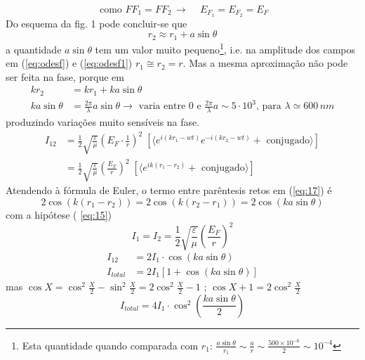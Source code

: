 \documentclass[a4paper,12pt]{article}
\begin{document}
\begin{equation}
	\label{eq:15} \text{ como } F F_1 = F F_2 \, \to \, \quad E_{F_1} = E_{F_2} = E_{F} 
\end{equation}
Do esquema da fig. 1 pode concluir-se que 
\begin{equation}
	\label{eq:16} r_2 \approx r_1 + a \sin \theta 
\end{equation}
a quantidade $ a \sin \theta $ tem um valor muito pequeno\footnote{Esta quantidade quando comparada com $ r_1$: \; $ \frac{a \sin \theta }{r_1 } \sim \frac{a}{r } \sim \frac{ 500 \times 10^{-6} }{2 } \sim 10^{-4}$},
i.e. na amplitude dos campos em (\ref{eq:odesf}) e (\ref{eq:odesf1}) $ r_1 \cong r_2 = r$. 
Mas a mesma aproximação não pode ser feita na fase, porque em 
\begin{align}
	k r_2 &= k r_1 +k a \sin \theta  \nonumber \\ %
	k a \sin \theta &= \frac{ 2 \pi }{\lambda } a \sin \theta  \rightarrow \text{ varia entre } 0 \text{ e } \frac{ 2 \pi}{\lambda} a \sim 5 \cdot 10^{3} \text{, para }  \lambda \simeq 600\,nm  \nonumber 
\end{align}
produzindo variações muito sensíveis na fase. 
\begin{align}
	\label{eq:17} I_{12} &=\frac{1}{2}\sqrt{\frac{ \varepsilon}{\mu}} \left(E_{F} \cdot \frac{1}{r }\right)^2 \; \left[ \langle e^{ i (k r_1 -wt )} e^{ -i (k r_2 -wt ) } + \text{ conjugado} \rangle \right] \nonumber \\
	&= \frac{1}{2}\sqrt{\frac{ \varepsilon}{\mu}} \left(\frac{E_F}{r }\right)^2 \; \left[ \langle e^{ i k (r_1 - r_2) } + \text{ conjugado} \rangle \right] 
\end{align}
Atendendo à fórmula de Euler, o termo entre parêntesis retos  em (\ref{eq:17}) é 
\begin{equation*}
	2 \cos ( k (r_1 - r_2) ) = 2 \cos ( k (r_2 - r_1) ) = 2 \cos ( k a \sin \theta ) 
\end{equation*}
com a hipótese ( \ref{eq:15}) 
\begin{equation}
	\label{eq:18} I_1= I_2 = \frac{1}{2}\sqrt{\frac{ \varepsilon}{\mu}} (\frac{E_F}{r })^2 
\end{equation}
\begin{align}
	I_{12} &= 2 I_1 \cdot \cos ( k a \sin \theta ) \\
	I_{total} &= 2 I_1 \left[ 1 + \cos ( k a \sin \theta ) \right ] 
\end{align}
mas $ \cos X = \cos^2 \frac{X}{2} - \sin^2 \frac{X}{2} = 2 \cos^2 \frac{X}{2} - 1$ ; $ \cos X +1 = 2 \cos^2 \frac{X}{2}$
\begin{equation}
	\label{eq:21} I_{total} = 4 I_1 \cdot  \cos^2 (\frac{k a \sin \theta }{2} ) 
\end{equation}
\end{document}
